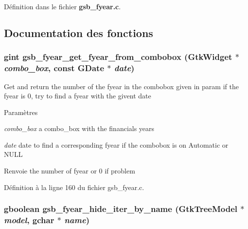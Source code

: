 Définition dans le fichier {\bf gsb\_\-fyear.c}.



\subsection{Documentation des fonctions}
\subsubsection[{gsb\_\-fyear\_\-get\_\-fyear\_\-from\_\-combobox}]{\setlength{\rightskip}{0pt plus 5cm}gint gsb\_\-fyear\_\-get\_\-fyear\_\-from\_\-combobox (GtkWidget $\ast$ {\em combo\_\-box}, \/  const GDate $\ast$ {\em date})}\label{gsb__fyear_8c_a587c6044305c503412e85ce68c61d18f}
Get and return the number of the fyear in the combobox given in param if the fyear is 0, try to find a fyear with the givent date


\begin{DoxyParams}{Paramètres}
\item[{\em combo\_\-box}]a combo\_\-box with the financials years \item[{\em date}]date to find a corresponding fyear if the combobox is on Automatic or NULL\end{DoxyParams}
\begin{DoxyReturn}{Renvoie}
the number of fyear or 0 if problem 
\end{DoxyReturn}


Définition à la ligne 160 du fichier gsb\_\-fyear.c.

\subsubsection[{gsb\_\-fyear\_\-hide\_\-iter\_\-by\_\-name}]{\setlength{\rightskip}{0pt plus 5cm}gboolean gsb\_\-fyear\_\-hide\_\-iter\_\-by\_\-name (GtkTreeModel $\ast$ {\em model}, \/  gchar $\ast$ {\em name})}\label{gsb__fyear_8c_a860e2fbddb31ed8ddb8d70a4d90e7c37}


